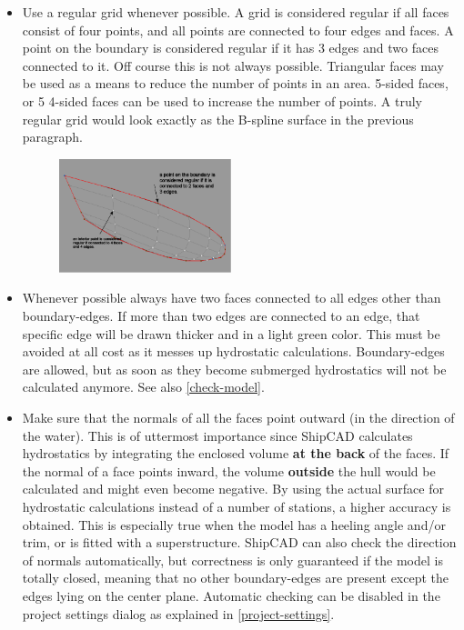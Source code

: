 \documentclass[12pt]{article}
\begin{document}
\begin{itemize}

\item Use a regular grid whenever possible. A grid is considered
regular if all faces consist of four points, and all points are
connected to four edges and faces. A point on the boundary is
considered regular if it has 3 edges and two faces connected to
it. Off course this is not always possible.  Triangular faces may be
used as a means to reduce the number of points in an area.  5-sided
faces, or 5 4-sided faces can be used to increase the number of
points. A truly regular grid would look exactly as the B-spline
surface in the previous paragraph.

\begin{figure}[h]
        \centering
        \includegraphics[width=5cm,natwidth=583,natheight=386]{figure7.png}
        \caption{}
        \label{fig:mesh6}
\end{figure}


  \item Whenever possible always have two faces connected to all edges
other than boundary-edges. If more than two edges are connected to an
edge, that specific edge will be drawn thicker and in a light green
color. This must be avoided at all cost as it messes up hydrostatic
calculations. Boundary-edges are allowed, but as soon as they become
submerged hydrostatics will not be calculated anymore. See also \ref{check-model}.

  \item Make sure that the normals of all the faces point outward (in
the direction of the water). This is of uttermost importance since
ShipCAD calculates hydrostatics by integrating the enclosed
volume \textbf{at the back} of the faces. If the normal of a face
points inward, the volume \textbf{outside} the hull would be
calculated and might even become negative. By using the actual surface
for hydrostatic calculations instead of a number of stations, a higher
accuracy is obtained. This is especially true when the model has a
heeling angle and/or trim, or is fitted with a superstructure. ShipCAD
can also check the direction of normals automatically, but correctness
is only guaranteed if the model is totally closed, meaning that no
other boundary-edges are present except the edges lying on the center
plane. Automatic checking can be disabled in the project settings
dialog as explained in \ref{project-settings}.

\end{itemize}
\end{document}
